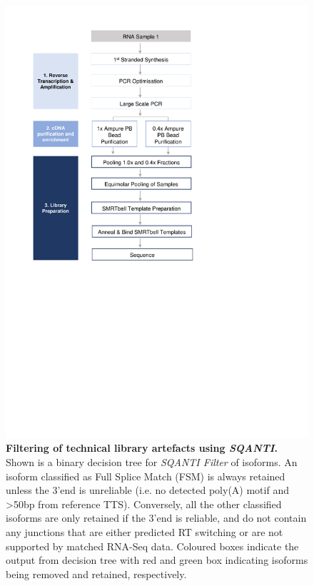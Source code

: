 \begin{figure}[!h]
	\begin{center}
		\includegraphics[page=19,trim={0 12cm 0 0},clip, scale = 0.8]{Figures/ProjectDevelopment_Figures.pdf}
	\end{center}
	\captionsetup{width=0.95\textwidth}
	\caption[Filtering of technical library artefacts using \textit{SQANTI}]%
	{\textbf{Filtering of technical library artefacts using \textit{SQANTI}.} Shown is a binary decision tree for \textit{SQANTI Filter} of isoforms. An isoform classified as Full Splice Match (FSM) is always retained unless the 3'end is unreliable (i.e. no detected poly(A) motif and >50bp from reference TTS). Conversely, all the other classified isoforms are only retained if the 3'end is reliable, and do not contain any junctions that are either predicted RT switching or are not supported by matched RNA-Seq data. Coloured boxes indicate the output from decision tree with red and green box indicating isoforms being removed and retained, respectively.}
	\label{fig:sqantifiltering}
\end{figure}

